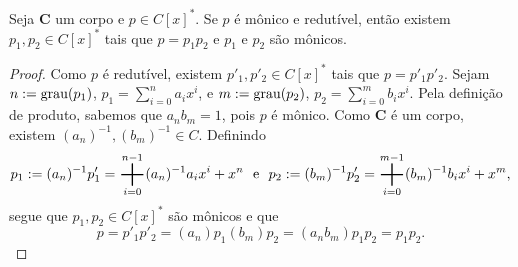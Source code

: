 \begin{prop}
	Seja $\bm C$ um corpo e $p \in C[x]^*$. Se $p$ é mônico e redutível, então existem $p_1,p_2 \in C[x]^*$ tais que $p=p_1p_2$ e $p_1$ e $p_2$ são mônicos.
\end{prop}
\begin{proof}
	Como $p$ é redutível, existem $p'_1,p'_2 \in C[x]^*$ tais que $p=p'_1p'_2$. Sejam $n := \operatorname{grau}(p_1)$, $p_1 = \sum_{i=0}^n a_ix^i$, e $m := \operatorname{grau}(p_2)$, $p_2 = \sum_{i=0}^m b_ix^i$. Pela definição de produto, sabemos que $a_nb_m=1$, pois $p$ é mônico. Como $\bm C$ é um corpo, existem $(a_n)^{-1},(b_m)^{-1} \in C$. Definindo
	\begin{equation*}
	p_1 := (a_n)^{-1}p'_1 = \sum_{i=0}^{n-1} (a_n)^{-1}a_ix^i+ x^n \e p_2 := (b_m)^{-1}p'_2 = \sum_{i=0}^{m-1} (b_m)^{-1}b_ix^i + x^m,
	\end{equation*}
segue que $p_1,p_2 \in C[x]^*$ são mônicos e que
	\begin{equation*}
	 p = p'_1p'_2 = (a_n)p_1(b_m)p_2 = (a_nb_m)p_1p_2 = p_1p_2.
	\end{equation*}
\end{proof}

